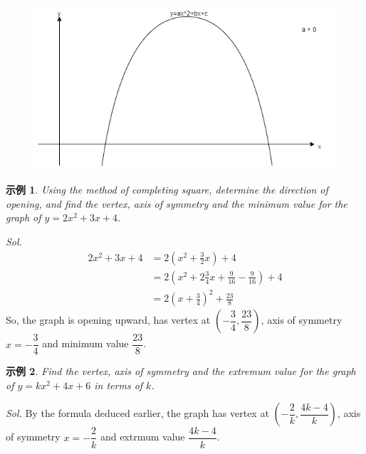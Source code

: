 \documentclass[12pt]{article}
\newtheorem{example}{示例}
\begin{document}
    \begin{figure}[H]
        \centering
        \includegraphics[scale=0.6]{open_downward.png}
    \end{figure}

    \begin{example}
        Using the method of completing square, determine the direction of opening, and find the vertex, axis of symmetry and the minimum value for the graph of $y=2x^2+3x+4$.
    \end{example}

    \textit{ Sol.}\begin{align*}
        2x^2+3x+4&=2(x^2+\frac{3}{2}x)+4\\
        &=2(x^2+2\frac{3}{4}x+\frac{9}{16}-\frac{9}{16})+4\\
        &=2(x+\frac{3}{4})^2+\frac{23}{8}
    \end{align*}
    So, the graph is opening upward, has vertex at $(-\dfrac{3}{4},\dfrac{23}{8})$, axis of symmetry $x=-\dfrac{3}{4}$ and minimum value $\dfrac{23}{8}$.

    \begin{example}
        Find the vertex, axis of symmetry and the extremum value for the graph of $y=kx^2+4x+6$ in terms of $k$.
    \end{example}

    \textit{ Sol.}
    By the formula deduced earlier, the graph has vertex at $(-\dfrac{2}{k},\dfrac{4k-4}{k})$, axis of symmetry $x=-\dfrac{2}{k}$ and extrmum value $\dfrac{4k-4}{k}$.
\end{document}
